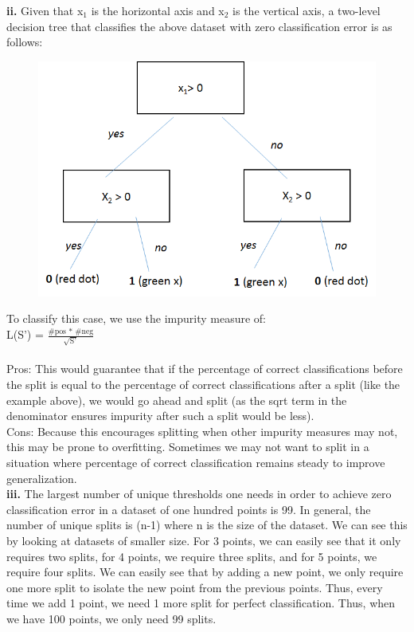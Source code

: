 \documentclass[12 pt]{article}
\begin{document}
	\noindent \textbf{ii.} Given that x$_1$ is the horizontal axis and x$_2$ is the vertical axis, a two-level decision tree that classifies the above dataset with zero classification error is as follows:
	\begin{figure}[H]
	\includegraphics[width=12cm]{validTree}
	\end{figure}	
	
	\noindent To classify this case, we use the impurity measure of: \\
	L(S') = $\frac{\text{\# pos * \# neg}}{\sqrt{\text{S'}}}$ \\ \\
	\noindent Pros: This would guarantee that if the percentage of correct classifications before the split is equal to the percentage of correct classifications after a split (like the example above), we would go ahead and split (as the sqrt term in the denominator ensures impurity after such a split would be less).  \\
	
	\noindent Cons: Because this encourages splitting when other impurity measures may not, this may be prone to overfitting. Sometimes we may not want to split in a situation where percentage of correct classification remains steady to improve generalization.  \\ 
	
	
	\noindent \textbf{iii.} The largest number of unique thresholds one needs in order to achieve zero classification error in a dataset of one hundred points is 99. In general, the number of unique splits is (n-1) where n is the size of the dataset. We can see this by looking at datasets of smaller size. For 3 points, we can easily see that it only requires two splits, for 4 points, we require three splits, and for 5 points, we require four splits. We can easily see that by adding a new point, we only require one more split to isolate the new point from the previous points. Thus, every time we add 1 point, we need 1 more split for perfect classification. Thus, when we have 100 points, we only need 99 splits. \\
\end{document}
